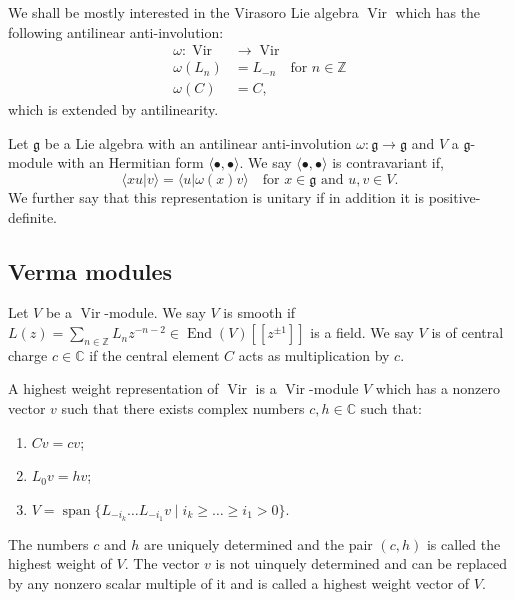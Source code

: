 \documentclass[a4paper, 12pt, reqno]{amsart}
\theoremstyle{remark}
\numberwithin{equation}{subsection}
\DeclareMathOperator{\Vir}{Vir}
\DeclareMathOperator{\End}{End}
\DeclareMathOperator{\vspan}{span}
\begin{document}
We shall be mostly interested in the Virasoro Lie algebra $\Vir$ which has the following antilinear anti-involution:
\begin{align*}
  \omega: \Vir &\to \Vir \\
  \omega(L_n) &= L_{-n} \quad \text{for }n \in \mathbb{Z} \\
  \omega(C) &= C,
\end{align*}
which is extended by antilinearity.

Let $\mathfrak{g}$ be a Lie algebra with an antilinear anti-involution $\omega: \mathfrak{g} \to \mathfrak{g}$ and $V$ a $\mathfrak{g}$-module with an Hermitian form $\langle \bullet, \bullet \rangle$.
We say $\langle \bullet, \bullet \rangle$ is contravariant if,
\begin{equation*}
  \langle xu| v \rangle = \langle u| \omega(x)v\rangle \quad \text{for }x \in \mathfrak{g}\text{ and }u, v \in V.
\end{equation*}
We further say that this representation is unitary if in addition it is positive-definite.

\subsection{Verma modules}
\label{sec:verma-modules}

Let $V$ be a $\Vir$-module.
We say $V$ is smooth if $L(z) = \sum_{n \in \mathbb{Z}}L_{n}z^{-n - 2} \in \End(V)[[z^{\pm 1}]]$ is a field.
We say $V$ is of central charge $c\in \mathbb{C}$ if the central element $C$ acts as multiplication by $c$.

A highest weight representation of $\Vir$ is a $\Vir$-module $V$ which has a nonzero vector $v$ such that there exists complex numbers $c, h \in \mathbb{C}$ such that:
\begin{enumerate}
  \item $Cv = cv$; 
  \item $L_0v = hv$;
  \item $V = \vspan\{L_{-i_k}\dots L_{-i_1}v \mid i_k \ge \dots \ge i_1 > 0\}$.
\end{enumerate}
The numbers $c$ and $h$ are uniquely determined and the pair $(c, h)$ is called the highest weight of $V$.
The vector $v$ is not uinquely determined and can be replaced by any nonzero scalar multiple of it and is called a highest weight vector of $V$.
\end{document}

